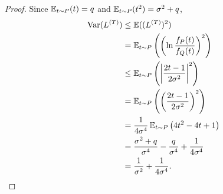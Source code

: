 \documentclass{article}
\theoremstyle{plain}
\theoremstyle{definition}
\theoremstyle{remark}
\begin{document}
\begin{proof}
    Since $\operatorname{\mathbb{E}}_{t\sim P}(t) = q$ and $\operatorname{\mathbb{E}}_{t\sim P}(t^2) = \sigma^2 + q$,
    \begin{equation}
        \begin{split}
            \operatorname{Var}(L^{(T)}) &\leq \operatorname{\mathbb{E}}((L^{(T)})^2) 
            \\&= \operatorname{\mathbb{E}}_{t\sim P}\left(\left(\ln \frac{f_P(t)}{f_Q(t)}\right)^2\right)
            \\&\leq \operatorname{\mathbb{E}}_{t\sim P}\left(\left|\frac{2t - 1}{2\sigma^2}\right|^2\right)
            \\&= \operatorname{\mathbb{E}}_{t\sim P}\left(\left(\frac{2t - 1}{2\sigma^2}\right)^2\right)
            \\&= \frac{1}{4\sigma^4}\operatorname{\mathbb{E}}_{t\sim P}\left(4t^2 - 4t + 1\right)
            \\&= \frac{\sigma^2 + q}{\sigma^4} - \frac{q}{\sigma^4} + \frac{1}{4\sigma^4}
            \\&= \frac{1}{\sigma^2} + \frac{1}{4\sigma^4}.
        \end{split}
    \end{equation}
\end{proof}
\end{document}
